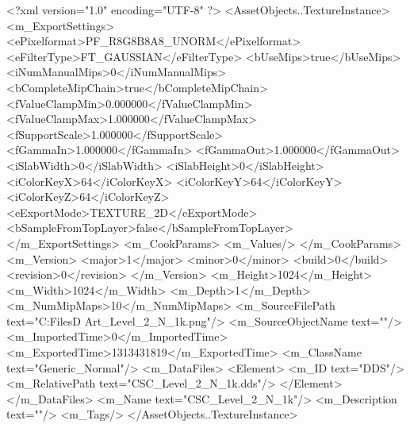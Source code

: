 <?xml version="1.0" encoding="UTF-8" ?>
<AssetObjects..TextureInstance>
	<m_ExportSettings>
		<ePixelformat>PF_R8G8B8A8_UNORM</ePixelformat>
		<eFilterType>FT_GAUSSIAN</eFilterType>
		<bUseMips>true</bUseMips>
		<iNumManualMips>0</iNumManualMips>
		<bCompleteMipChain>true</bCompleteMipChain>
		<fValueClampMin>0.000000</fValueClampMin>
		<fValueClampMax>1.000000</fValueClampMax>
		<fSupportScale>1.000000</fSupportScale>
		<fGammaIn>1.000000</fGammaIn>
		<fGammaOut>1.000000</fGammaOut>
		<iSlabWidth>0</iSlabWidth>
		<iSlabHeight>0</iSlabHeight>
		<iColorKeyX>64</iColorKeyX>
		<iColorKeyY>64</iColorKeyY>
		<iColorKeyZ>64</iColorKeyZ>
		<eExportMode>TEXTURE_2D</eExportMode>
		<bSampleFromTopLayer>false</bSampleFromTopLayer>
	</m_ExportSettings>
	<m_CookParams>
		<m_Values/>
	</m_CookParams>
	<m_Version>
		<major>1</major>
		<minor>0</minor>
		<build>0</build>
		<revision>0</revision>
	</m_Version>
	<m_Height>1024</m_Height>
	<m_Width>1024</m_Width>
	<m_Depth>1</m_Depth>
	<m_NumMipMaps>10</m_NumMipMaps>
	<m_SourceFilePath text="C:\Users\Shadow\Desktop\Working Files\3D Art\CSC_Level_2_N_1k.png"/>
	<m_SourceObjectName text=""/>
	<m_ImportedTime>0</m_ImportedTime>
	<m_ExportedTime>1313431819</m_ExportedTime>
	<m_ClassName text="Generic_Normal"/>
	<m_DataFiles>
		<Element>
			<m_ID text="DDS"/>
			<m_RelativePath text="CSC_Level_2_N_1k.dds"/>
		</Element>
	</m_DataFiles>
	<m_Name text="CSC_Level_2_N_1k"/>
	<m_Description text=""/>
	<m_Tags/>
</AssetObjects..TextureInstance>

